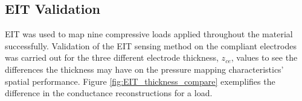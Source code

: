 	\subsection{EIT Validation}
	\label{subsec:eit_validation}
    EIT was used to map nine compressive loads applied throughout the material successfully. Validation of the EIT sensing method on the compliant electrodes was carried out for the three different electrode thickness, $z_{ce}$, values to see the differences the thickness may have on the pressure mapping characteristics' spatial performance. Figure \ref{fig:EIT_thickness_compare} exemplifies the difference in the conductance reconstructions for a load.
	\begin{figure}[H]
		\centering
		\hspace{0.2cm}
		\hspace{0.2cm}

\end{figure}

